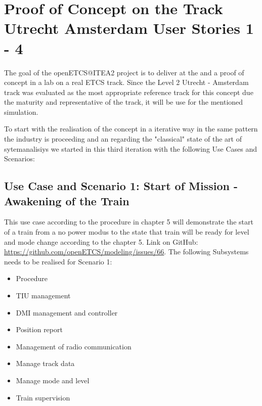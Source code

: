 
\section{Proof of Concept on the Track Utrecht Amsterdam User Stories 1 - 4}

The goal of the openETCS@ITEA2 project is to deliver at the and a proof of concept in a lab on a real ETCS track. Since the Level 2 Utrecht - Amsterdam track was evaluated as the most appropriate reference track for this concept due the maturity and representative of the track, it will be use for the mentioned simulation.

To start with the realisation of the concept in a iterative way in the same pattern the industry is proceeding and an regarding the "classical" state of the art of sytemanalisiys we started in this third iteration with the following Use Cases and Scenarios:

\subsection{Use Case and Scenario 1: Start of Mission - Awakening of the Train}
This use case according to the procedure in chapter 5 will demonstrate the start of a train from a no power modus to the state that train will be ready for level and mode change according to the chapter 5. Link on GitHub: \url{https://github.com/openETCS/modeling/issues/66}. The following Subsystems needs to be realised for Scenario 1:
\begin{itemize}
\item Procedure
\item TIU management
\item DMI management and controller
\item Position report
\item Management of radio communication
\item Manage track data
\item Manage mode and level
\item Train supervision
\end{itemize}

